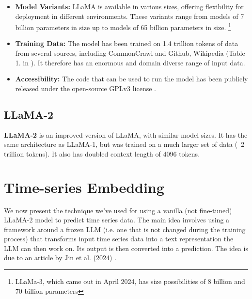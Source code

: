 \begin{itemize}
	\item \textbf{Model Variants:} LLaMA is available in various sizes, offering flexibility for deployment in different environments. These variants range from models of 7 billion parameters in size up to models of 65 billion parameters in size. \footnote{LLaMa-3, which came out in April 2024, has size possibilities of 8 billion and 70 billion parameters}

	\item \textbf{Training Data:} The model has been trained on 1.4 trillion tokens of data from several sources, including CommonCrawl and Github, Wikipedia (Table 1. in \cite{llama}). It therefore has an enormous and domain diverse range of input data.


	\item \textbf{Accessibility:} The code that can be used to run the model has been publicly released under the open-source GPLv3 license \cite{llama_code}.
\end{itemize}

\subsection{LLaMA-2}
\textbf{LLaMA-2} \cite{llama2} is an improved version of LLaMA, with similar model sizes. It has the same architecture as LLaMA-1, but was trained on a much larger set of data (~2 trillion tokens). It also has doubled context length of 4096 tokens.

\section{Time-series Embedding}
We now present the technique we've used for using a vanilla (not fine-tuned) LLaMA-2 model to predict time series data.
The main idea involves using a framework around a frozen LLM (i.e. one that is not changed during the training process) that transforms input time series data into a text representation the LLM can then work on. Its output is then converted into a prediction. The idea is due to an article by Jin et al. (2024) \cite{reprogramming_llm}.

